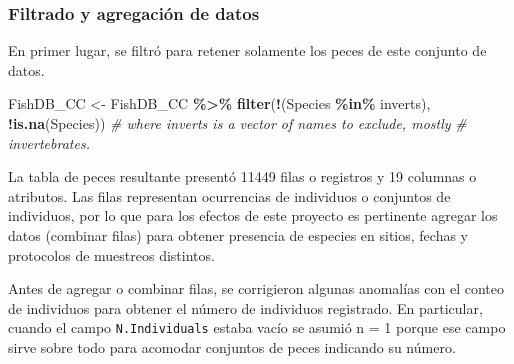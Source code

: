 \documentclass[sn-apa,pdflatex]{sn-jnl}
\newenvironment{Shaded}{\begin{snugshade}}{\end{snugshade}}
\newcommand{\AttributeTok}[1]{\textcolor[rgb]{0.13,0.29,0.53}{#1}}
\newcommand{\CommentTok}[1]{\textcolor[rgb]{0.56,0.35,0.01}{\textit{#1}}}
\newcommand{\ConstantTok}[1]{\textcolor[rgb]{0.56,0.35,0.01}{#1}}
\newcommand{\DecValTok}[1]{\textcolor[rgb]{0.00,0.00,0.81}{#1}}
\newcommand{\FunctionTok}[1]{\textcolor[rgb]{0.13,0.29,0.53}{\textbf{#1}}}
\newcommand{\NormalTok}[1]{#1}
\newcommand{\OtherTok}[1]{\textcolor[rgb]{0.56,0.35,0.01}{#1}}
\newcommand{\SpecialCharTok}[1]{\textcolor[rgb]{0.81,0.36,0.00}{\textbf{#1}}}
\begin{document}
\subsubsection{Filtrado y agregación de
datos}\label{filtrado-y-agregaciuxf3n-de-datos}

En primer lugar, se filtró para retener solamente los peces de este
conjunto de datos.

\begin{Shaded}
\begin{Highlighting}[]
\NormalTok{FishDB\_CC }\OtherTok{\textless{}{-}}\NormalTok{ FishDB\_CC }\SpecialCharTok{\%\textgreater{}\%}
    \FunctionTok{filter}\NormalTok{(}\SpecialCharTok{!}\NormalTok{(Species }\SpecialCharTok{\%in\%}\NormalTok{ inverts), }\SpecialCharTok{!}\FunctionTok{is.na}\NormalTok{(Species))}
\CommentTok{\# where inverts is a vector of names to exclude, mostly}
\CommentTok{\# invertebrates.}
\end{Highlighting}
\end{Shaded}

La tabla de peces resultante presentó 11449 filas o registros y 19
columnas o atributos. Las filas representan ocurrencias de individuos o
conjuntos de individuos, por lo que para los efectos de este proyecto es
pertinente agregar los datos (combinar filas) para obtener presencia de
especies en sitios, fechas y protocolos de muestreos distintos.

Antes de agregar o combinar filas, se corrigieron algunas anomalías con
el conteo de individuos para obtener el número de individuos registrado.
En particular, cuando el campo \texttt{N.Individuals} estaba vacío se
asumió n = 1 porque ese campo sirve sobre todo para acomodar conjuntos
de peces indicando su número.

\begin{Shaded}
\end{Shaded}
\end{document}
